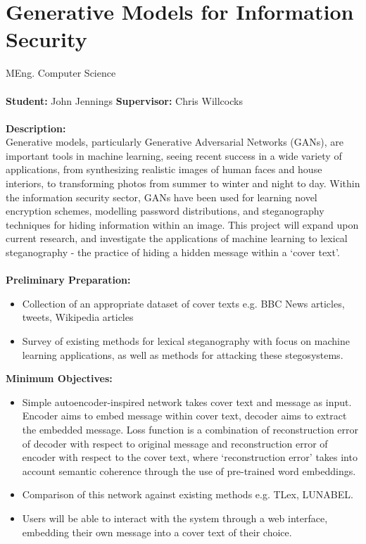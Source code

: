 \documentclass[10pt]{article}
\begin{document}
\newcommand{\bi}{\begin{itemize}}
\newcommand{\ei}{\end{itemize}}

\section*{Generative Models for Information Security}

\bigskip

 MEng. Computer Science \\
\\ 
{\bf Student:} John Jennings  \hspace{3mm} {\bf Supervisor:} Chris Willcocks \\
\\ 
{\bf Description:} \vspace{1mm} \\
Generative models, particularly Generative Adversarial Networks (GANs), are important tools in machine learning, seeing recent success in a wide variety of applications, from synthesizing realistic images of human faces and house interiors, to transforming photos from summer to winter and night to day. Within the information security sector, GANs have been used for learning novel encryption schemes, modelling password distributions, and steganography techniques for hiding information within an image. This project will expand upon current research, and investigate the applications of machine learning to lexical steganography - the practice of hiding a hidden message within a `cover text'.\\
\\
{\bf Preliminary Preparation:}
  \begin{itemize}
    \item Collection of an appropriate dataset of cover texts e.g. BBC News articles, tweets, Wikipedia articles
    \item Survey of existing methods for lexical steganography with focus on machine learning applications, as well as methods for attacking these stegosystems.
  \end{itemize}
{\bf Minimum Objectives:}
  \begin{itemize}  
    \item Simple autoencoder-inspired network takes cover text and message as input. Encoder aims to embed message within cover text, decoder aims to extract the embedded message. Loss function is a combination of reconstruction error of decoder with respect to original message and reconstruction error of encoder with respect to the cover text, where `reconstruction error' takes into account semantic coherence through the use of pre-trained word embeddings.
    \item Comparison of this network against existing methods e.g. TLex, LUNABEL.
    \item Users will be able to interact with the system through a web interface, embedding their own message into a cover text of their choice.
  \end{itemize}
\end{document}
